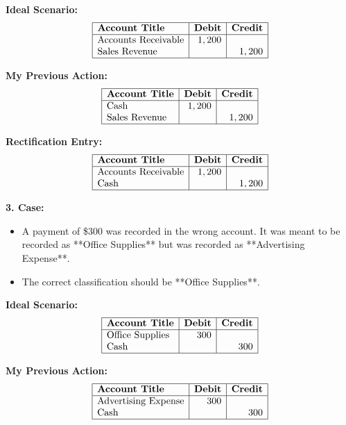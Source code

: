 \documentclass[12pt,a4paper]{book}
\begin{document}
\begin{multicols}{2}
    
    
    \textbf{Ideal Scenario:}
    \[
    \begin{array}{|l|r|r|}
\hline
\textbf{Account Title} & \textbf{Debit} & \textbf{Credit} \\
\hline
\text{Accounts Receivable} & 1,200 & \\
\text{Sales Revenue} & & 1,200 \\
\hline
\end{array}
\]

\textbf{My Previous Action:}
\[
\begin{array}{|l|r|r|}
    \hline
\textbf{Account Title} & \textbf{Debit} & \textbf{Credit} \\
\hline
\text{Cash} & 1,200 & \\
\text{Sales Revenue} & & 1,200 \\
\hline
\end{array}
\]
\end{multicols}

\textbf{Rectification Entry:}
\[
\begin{array}{|l|r|r|}
\hline
\textbf{Account Title} & \textbf{Debit} & \textbf{Credit} \\
\hline
\text{Accounts Receivable} & 1,200 & \\
\text{Cash} & & 1,200 \\
\hline
\end{array}
\]

\vspace{0.5cm}

\textbf{3. Case:}
\begin{itemize}
    \item A payment of \$300 was recorded in the wrong account. It was meant to be recorded as **Office Supplies** but was recorded as **Advertising Expense**.
    \item The correct classification should be **Office Supplies**.
\end{itemize}

\begin{multicols}{2}
\textbf{Ideal Scenario:}
\[
\begin{array}{|l|r|r|}
\hline
\textbf{Account Title} & \textbf{Debit} & \textbf{Credit} \\
\hline
\text{Office Supplies} & 300 & \\
\text{Cash} & & 300 \\
\hline
\end{array}
\]

\textbf{My Previous Action:}
\[
\begin{array}{|l|r|r|}
\hline
\textbf{Account Title} & \textbf{Debit} & \textbf{Credit} \\
\hline
\text{Advertising Expense} & 300 & \\
\text{Cash} & & 300 \\
\hline
\end{array}
\]
\end{multicols}
\end{document}
